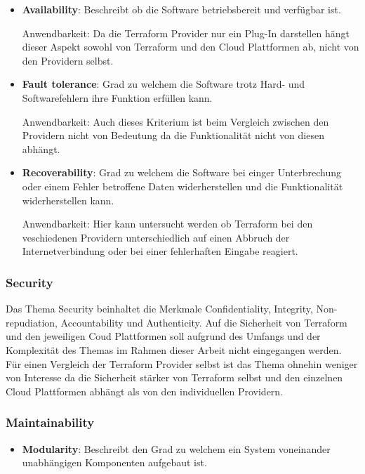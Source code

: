 \begin{spacing}{1.2}
\begin{itemize}
  \item \textbf{Availability}: Beschreibt ob die Software betriebsbereit
  und verfügbar ist.

  Anwendbarkeit: Da die Terraform Provider nur ein Plug-In darstellen
  hängt dieser Aspekt sowohl von Terraform und den Cloud Plattformen ab,
  nicht von den Providern selbst.

  \item \textbf{Fault tolerance}: Grad zu welchem die Software trotz
  Hard- und Softwarefehlern ihre Funktion erfüllen kann.

  Anwendbarkeit: Auch dieses Kriterium ist beim Vergleich zwischen den
  Providern nicht von Bedeutung da die Funktionalität nicht von diesen
  abhängt.

  \item \textbf{Recoverability}: Grad zu welchem die Software bei einger
  Unterbrechung oder einem Fehler betroffene Daten widerherstellen und
  die Funktionalität widerherstellen kann.

  Anwendbarkeit: Hier kann untersucht werden ob Terraform bei
  den veschiedenen Providern unterschiedlich auf einen Abbruch der 
  Internetverbindung oder bei einer fehlerhaften Eingabe reagiert.

\end{itemize}

\subsubsection{Security}

Das Thema Security beinhaltet die Merkmale Confidentiality, Integrity,
Non-repudiation, Accountability und Authenticity. Auf die
Sicherheit von Terraform und den jeweiligen Coud Plattformen soll
aufgrund des Umfangs und der Komplexität des Themas im Rahmen dieser
Arbeit nicht eingegangen werden. Für einen Vergleich der Terraform
Provider selbst ist das Thema ohnehin weniger von Interesse da die
Sicherheit stärker von Terraform selbst und den einzelnen Cloud
Plattformen abhängt als von den individuellen Providern. 

\subsubsection{Maintainability}

\begin{itemize}
  \item \textbf{Modularity}: Beschreibt den Grad zu welchem ein System 
  voneinander unabhängigen Komponenten aufgebaut ist.


\end{itemize}
\end{spacing}
